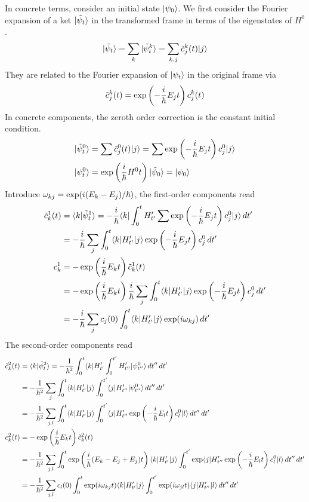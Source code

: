 In concrete terms, consider an initial state $|\psi_0\rangle$. 
We first consider the Fourier expansion of a ket $|\tilde \psi_t\rangle$ in the 
transformed frame in terms of the eigenstates of $H^0$. 
\[ 
    |\tilde \psi_t\rangle = \sum_k |\tilde \psi_t^k\rangle = \sum_{k, j} \tilde c_j^k(t) |j\rangle 
\] 
They are related to the Fourier expansion of $|\psi_t\rangle$ in the original frame via 
\[ 
    \tilde c_j^k(t) = \exp\left(-\dfrac i {\hbar} E_j t\right)c_j^k(t)
\] 
In concrete components, the zeroth order correction is the constant initial condition. 
\[\begin{aligned}
    |\tilde \psi^0_t\rangle &= \sum \tilde c_j^0(t) |j\rangle = \sum \exp\left(-\dfrac i {\hbar} E_j t\right) c_j^0 |j\rangle \\ 
    |\psi_t^0\rangle &= \exp\left(\dfrac i {\hbar} H^0 t\right)|\tilde \psi_0\rangle = |\psi_0\rangle 
\end{aligned}\] 
Introduce $\omega_{kj} = \exp(i(E_k-E_j)/\hbar)$, the first-order components read 
\[\begin{aligned}
    \tilde c_k^1(t)
    &= \langle k|\tilde \psi_t^1\rangle 
        = -\dfrac i {\hbar} \langle k |\int_0^t H'_{t'}  \sum \exp\left(-\dfrac i {\hbar} E_j t\right) c_j^0 |j\rangle \, dt' \\ 
        &= -\dfrac i {\hbar} \sum_j \int_0^t \langle k|H'_{t'}|j\rangle \exp\left(-\dfrac i {\hbar} E_j t\right) c_j^0\, dt' \\ 
    c_k^1 &= -\exp\left(\dfrac i {\hbar} E_k t \right) \tilde c_k^1(t) \\
    &= -\exp\left(\dfrac i {\hbar} E_k t \right)\dfrac i {\hbar} \sum_j \int_0^t \langle k|H'_{t'}|j\rangle \exp\left(-\dfrac i {\hbar} E_j t\right) c_j^0\, dt' \\ 
    &= -\dfrac i {\hbar} \sum_j c_j(0) \int_0^t \langle k|H'_{t'}|j\rangle \exp(i\omega_{kj})\, dt'
\end{aligned}\] 
The second-order components read 
\[\begin{aligned}
    \tilde c_k^2(t)
    &= \langle k|\tilde \psi_t^2\rangle = -\dfrac 1 {\hbar^2}\int_0^t \langle k| H'_{t'}\int_0^{t'} H'_{t''} |\psi_{t''}^0\rangle \, dt''\, dt'\\ 
    &= -\dfrac 1 {\hbar^2}\sum_j \int_0^t \langle k| H'_{t'}|j\rangle \int_0^{t'} \langle j|H'_{t''} |\psi_{t''}^0\rangle \, dt''\, dt'\\ 
    &= -\dfrac 1 {\hbar^2}\sum_{j, l} \int_0^t \langle k| H'_{t'}|j\rangle \int_0^{t'} \langle j|H'_{t''} \exp\left(-\dfrac i {\hbar} E_l t\right) c_l^0|l\rangle  \, dt''\, dt'\\ 
    c_k^2(t) &= -\exp\left(\dfrac i {\hbar} E_k t \right) \tilde c_k^2(t) \\
    &= -\dfrac 1 {\hbar^2}\sum_{j, l} \int_0^t \exp\left(\dfrac i {\hbar} (E_k-E_j+E_j) t \right) \langle k| H'_{t'}|j\rangle \int_0^{t'} 
        \exp\langle j|H'_{t''} \exp\left(-\dfrac i {\hbar} E_l t\right) c_l^0|l\rangle  \, dt''\, dt'\\ 
    &= -\dfrac 1 {\hbar^2}\sum_{j, l} c_l(0) \int_0^t \exp(i\omega_{kj}t)\langle k| H'_{t'}|j\rangle \int_0^{t'} \exp(i\omega_{jl}t)\langle j|H'_{t''} |l\rangle  \, dt''\, dt'\\ 
\end{aligned}\] 

